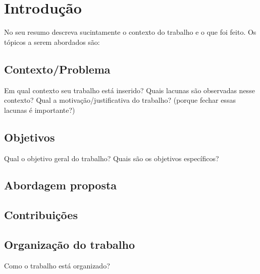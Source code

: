 \section{Introdução}
No seu resumo descreva sucintamente o contexto do trabalho e o que foi feito. Os tópicos a serem abordados são: 

\subsection{Contexto/Problema}
Em qual contexto seu trabalho está inserido? 
Quais lacunas são observadas nesse contexto?
Qual a motivação/justificativa do trabalho? (porque fechar essas lacunas é importante?)
 
\subsection{Objetivos}
Qual o objetivo geral do trabalho?
Quais são os objetivos específicos?

\subsection{Abordagem proposta}

\subsection{Contribuições}

\subsection{Organização do trabalho}

Como o trabalho está organizado?